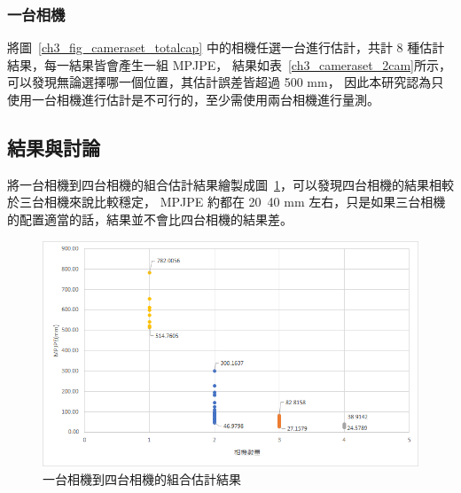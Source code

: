 \subsubsection{一台相機}
將圖~\ref{ch3_fig_cameraset_totalcap} 中的相機任選一台進行估計，共計 8 種估計結果，每一結果皆會產生一組 MPJPE，
結果如表~\ref{ch3_cameraset_2cam}所示，可以發現無論選擇哪一個位置，其估計誤差皆超過 500 mm，
因此本研究認為只使用一台相機進行估計是不可行的，至少需使用兩台相機進行量測。
\begin{table}[!ht]
   \caption[一台相機組合與其估計結果誤差]{一台相機組合與其估計結果誤差}
   \centering
   \label{ch3_cameraset_1cam}
   \setlength{\tabcolsep}{3pt}
   \renewcommand\arraystretch{1.5}
\end{table}

\subsection{結果與討論}
將一台相機到四台相機的組合估計結果繪製成圖~\ref{ch3_fig_1.2.3.4cam}，可以發現四台相機的結果相較於三台相機來說比較穩定，
MPJPE 約都在 20~40 mm 左右，只是如果三台相機的配置適當的話，結果並不會比四台相機的結果差。
\begin{figure}[!ht]
   \centering
   \includegraphics[width=12cm]{figure/ch3_fig_1.2.3.4cam.png}
   \caption[一台相機到四台相機的組合估計結果]{一台相機到四台相機的組合估計結果}
   \label{ch3_fig_1.2.3.4cam}
\end{figure}

